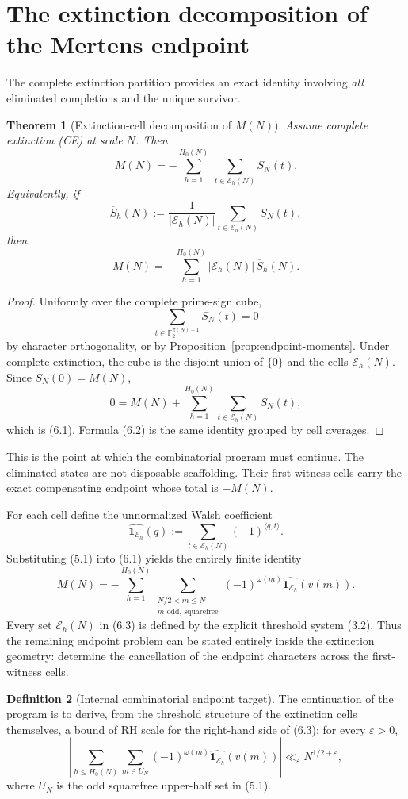 \documentclass[11pt]{article}
\newtheorem{theorem}{Theorem}[section]
\theoremstyle{definition}
\newtheorem{definition}[theorem]{Definition}
\theoremstyle{remark}
\newcommand{\Ftwo}{\mathbb F_2}
\newcommand{\EH}{\mathcal E}
\begin{document}
\section{The extinction decomposition of the Mertens endpoint}

The complete extinction partition provides an exact identity involving \emph{all} eliminated completions and the unique survivor.

\begin{theorem}[Extinction-cell decomposition of $M(N)$]\label{thm:cell-decomp}
Assume complete extinction (CE) at scale $N$.  Then
\[
 \boxed{
 M(N)
 =-\sum_{h=1}^{H_0(N)}\ \sum_{t\in\EH_h(N)}S_N(t).
 }
 \tag{6.1}
\]
Equivalently, if
\[
 \overline S_h(N):=\frac1{|\EH_h(N)|}\sum_{t\in\EH_h(N)}S_N(t),
\]
then
\[
 \boxed{
 M(N)=-\sum_{h=1}^{H_0(N)}|\EH_h(N)|\,\overline S_h(N).
 }
 \tag{6.2}
\]
\end{theorem}

\begin{proof}
Uniformly over the complete prime-sign cube,
\[
 \sum_{t\in\Ftwo^{\pi(N)-1}}S_N(t)=0
\]
by character orthogonality, or by Proposition~\ref{prop:endpoint-moments}.  Under complete extinction, the cube is the disjoint union of $\{0\}$ and the cells $\EH_h(N)$.  Since $S_N(0)=M(N)$,
\[
 0=M(N)+\sum_{h=1}^{H_0(N)}\sum_{t\in\EH_h(N)}S_N(t),
\]
which is (6.1).  Formula (6.2) is the same identity grouped by cell averages.
\end{proof}

This is the point at which the combinatorial program must continue.  The eliminated states are not disposable scaffolding.  Their first-witness cells carry the exact compensating endpoint whose total is $-M(N)$.

For each cell define the unnormalized Walsh coefficient
\[
 \widehat{\mathbf1_{\EH_h}}(q)
 :=\sum_{t\in\EH_h(N)}(-1)^{\langle q,t\rangle}.
\]
Substituting (5.1) into (6.1) yields the entirely finite identity
\[
 \boxed{
 M(N)=
 -\sum_{h=1}^{H_0(N)}
 \sum_{\substack{N/2<m\le N\\m\text{ odd, squarefree}}}
 (-1)^{\omega(m)}
 \widehat{\mathbf1_{\EH_h}}(v(m)).
 }
 \tag{6.3}
\]
Every set $\EH_h(N)$ in (6.3) is defined by the explicit threshold system (3.2).  Thus the remaining endpoint problem can be stated entirely inside the extinction geometry: determine the cancellation of the endpoint characters across the first-witness cells.

\begin{definition}[Internal combinatorial endpoint target]
The continuation of the program is to derive, from the threshold structure of the extinction cells themselves, a bound of RH scale for the right-hand side of (6.3): for every $\varepsilon>0$,
\[
 \boxed{
 \left|
 \sum_{h\le H_0(N)}
 \sum_{m\in U_N}
 (-1)^{\omega(m)}
 \widehat{\mathbf1_{\EH_h}}(v(m))
 \right|
 \ll_\varepsilon N^{1/2+\varepsilon},
 }
 \tag{CET}
\]
where $U_N$ is the odd squarefree upper-half set in (5.1).
\end{definition}
\end{document}
